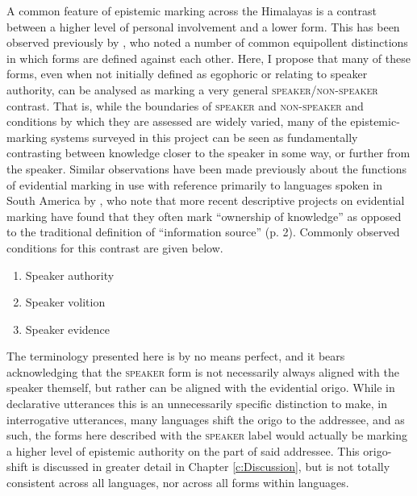 A common feature of epistemic marking across the Himalayas is a contrast between a higher level of personal involvement and a lower form. This has been observed previously by , who noted a number of common equipollent distinctions in which forms are defined against each other. Here, I propose that many of these forms, even when not initially defined as egophoric or relating to speaker authority, can be analysed as marking a very general \textsc{speaker}/\textsc{non-speaker} contrast. That is, while the boundaries of \textsc{speaker} and \textsc{non-speaker} and conditions by which they are assessed are widely varied, many of the epistemic-marking systems surveyed in this project can be seen as fundamentally contrasting between knowledge closer to the speaker in some way, or further from the speaker. Similar observations have been made previously about the functions of evidential marking in use with reference primarily to languages spoken in South America by , who note that more recent descriptive projects on evidential marking have found that they often mark ``ownership of knowledge'' as opposed to the traditional definition of ``information source'' (p. 2). Commonly observed conditions for this contrast are given below. 

\begin{enumerate}
        \item Speaker authority
        \item Speaker volition
        \item Speaker evidence
\end{enumerate} 

The terminology presented here is by no means perfect, and it bears acknowledging that the \textsc{speaker} form is not necessarily always aligned with the speaker themself, but rather can be aligned with the evidential origo. While in declarative utterances this is an unnecessarily specific distinction to make, in interrogative utterances, many languages shift the origo to the addressee, and as such, the forms here described with the \textsc{speaker} label would actually be marking a higher level of epistemic authority on the part of said addressee. This origo-shift is discussed in greater detail in Chapter \ref{c:Discussion}, but is not totally consistent across all languages, nor across all forms within languages. 

